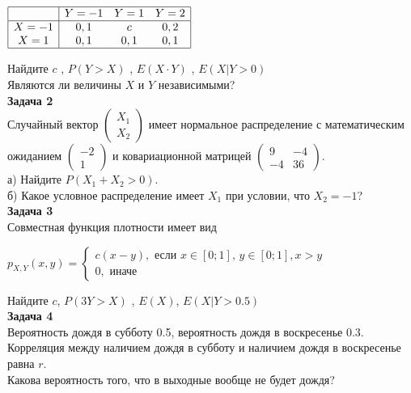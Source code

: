 \documentclass[pdftex,12pt,a4paper]{article}
\begin{document}
$\begin{array}{|c|ccc|} 
\hline 
{} & {Y=-1} & {Y=1} & {Y=2}\\  
\hline 
{X=-1} & {0,1} & {c} & {0,2}\\ 
{X=1} & {0,1} & {0,1} & {0,1} \\  
\hline  
\end{array}$

Найдите  $c$ ,  $P\left(Y>X\right)$ ,  $E\left(X\cdot Y
\right)$ ,  $E\left(X|Y>0\right)$ \\
Являются ли величины $X$ и $Y$ независимыми? \\

\textbf{Задача 2} \\ %
Случайный вектор  $\left(\begin{array}{c}
{X_{1} } \\ {X_{2} }
\end{array}\right)$  имеет нормальное распределение с
математическим ожиданием  $\left(\begin{array}{c} {-2} \\ {1}
\end{array}\right)$  и ковариационной матрицей
$\left(\begin{array}{cc} {9} & {-4} \\ {-4} & {36}
\end{array}\right)$. \\
а) Найдите  $P\left(X_{1} +X_{2} >0\right)$. \\
б) Какое условное распределение имеет $X_{1}$ при условии, что $X_{2}=-1$? \\

\textbf{Задача 3} \\ %
Совместная функция плотности имеет вид

$p_{X,Y} \left(x,y\right)=\left\{\begin{array}{l} {c(x-y),
\text{ если } x\in \left[0;1\right],\, y\in \left[0;1\right], x>y} \\
{0,\text{ иначе} } \end{array}\right. $

Найдите  $c$, $P\left(3Y>X\right)$ ,  $E\left(X\right)$, $E(X|Y>0.5)$ \\



\textbf{Задача 4} \\ 
Вероятность дождя в субботу 0.5, вероятность дождя в воскресенье 0.3. Корреляция между наличием дождя в субботу и наличием дождя в воскресенье равна $r$. \\
Какова вероятность того, что в выходные вообще не будет дождя? \\
\end{document}
